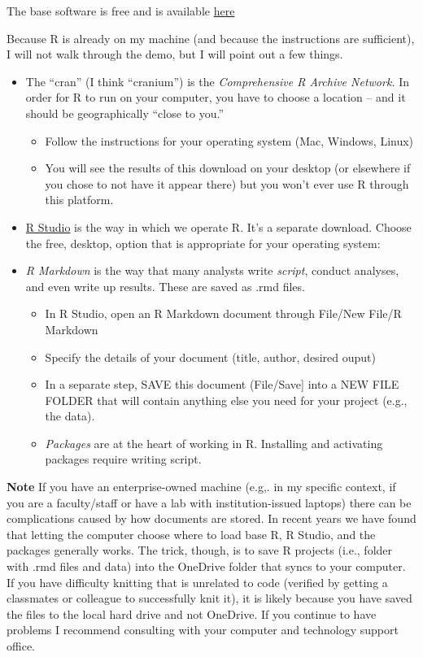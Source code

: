 \documentclass[
  11pt,
]{book}
\providecommand{\tightlist}{%
  \setlength{\itemsep}{0pt}\setlength{\parskip}{0pt}}
\begin{document}
The base software is free and is available \href{https://www.r-project.org/}{here}

Because R is already on my machine (and because the instructions are sufficient), I will not walk through the demo, but I will point out a few things.

\begin{itemize}
\tightlist
\item
  The ``cran'' (I think ``cranium'') is the \emph{Comprehensive R Archive Network.} In order for R to run on your computer, you have to choose a location -- and it should be geographically ``close to you.''

  \begin{itemize}
  \tightlist
  \item
    Follow the instructions for your operating system (Mac, Windows, Linux)
  \item
    You will see the results of this download on your desktop (or elsewhere if you chose to not have it appear there) but you won't ever use R through this platform.
  \end{itemize}
\item
  \href{https://www.rstudio.com/products/RStudio/}{R Studio} is the way in which we operate R. It's a separate download. Choose the free, desktop, option that is appropriate for your operating system:\\
\item
  \emph{R Markdown} is the way that many analysts write \emph{script}, conduct analyses, and even write up results. These are saved as .rmd files.

  \begin{itemize}
  \tightlist
  \item
    In R Studio, open an R Markdown document through File/New File/R Markdown
  \item
    Specify the details of your document (title, author, desired ouput)
  \item
    In a separate step, SAVE this document (File/Save{]} into a NEW FILE FOLDER that will contain anything else you need for your project (e.g., the data).
  \item
    \emph{Packages} are at the heart of working in R. Installing and activating packages require writing script.
  \end{itemize}
\end{itemize}

\textbf{Note} If you have an enterprise-owned machine (e.g,. in my specific context, if you are a faculty/staff or have a lab with institution-issued laptops) there can be complications caused by how documents are stored. In recent years we have found that letting the computer choose where to load base R, R Studio, and the packages generally works. The trick, though, is to save R projects (i.e., folder with .rmd files and data) into the OneDrive folder that syncs to your computer. If you have difficulty knitting that is unrelated to code (verified by getting a classmates or colleague to successfully knit it), it is likely because you have saved the files to the local hard drive and not OneDrive. If you continue to have problems I recommend consulting with your computer and technology support office.
\end{document}
